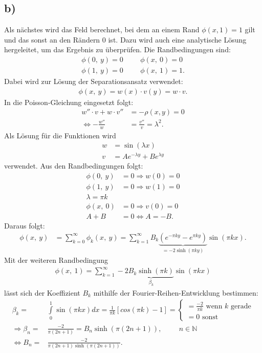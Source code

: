 \subsection*{b)}
Als nächstes wird das Feld berechnet, bei dem an einem Rand $\phi(x,1)=1$ gilt und das sonst an den Rändern 0 ist.
Dazu wird auch eine analytische Lösung hergeleitet, um das Ergebnis zu überprüfen.
Die Randbedingungen sind:
\begin{align}
	\phi(0,\ y)=0\hspace{1cm}\phi(x,\ 0)=0\\
	\phi(1,\ y)=0\hspace{1cm}\phi(x,\ 1)=1.
\end{align}
Dabei wird zur Lösung der Separationsansatz verwendet: 
\begin{align}
	\phi(x,\ y)=w(x)\cdot v(y)=w\cdot v.
\end{align}
In die Poisson-Gleichung eingesetzt folgt:
\begin{align}
	w'' \cdot v + w\cdot v'' &= -\rho(x,y)=0\\
	\Leftrightarrow-\frac{w''}{w}&=\frac{v''}{v}=\lambda^2.
\end{align}
Als Lösung für die Funktionen wird
\begin{align}
	w&=\sin(\lambda x)\label{eq:w}\\
	v&=Ae^{-\lambda y}+Be^{\lambda y}
\end{align}
verwendet.
Aus den Randbedingungen folgt:
\begin{align}
	\phi(0,\ y)&=0\Rightarrow w(0)=0\\
	\phi(1,\ y)&=0\Rightarrow w(1)=0\\
	\lambda = \pi k\\
	\phi(x,\ 0)&=0\Rightarrow v(0)=0\\
	A+B&=0\Leftrightarrow A=-B.
\end{align}
Daraus folgt:
\begin{align}
	\phi(x,\ y)&=\sum\limits_{k=0}^{\infty}\phi_k(x,\ y)=\sum\limits_{k=1}^{\infty}B_k\underbrace{\left( e^{-\pi ky }-e^{\pi k y} \right)}_{=-2\sinh(\pi k y)}\sin(\pi k x).
\end{align}
Mit der weiteren Randbedingung
\begin{align}
	\phi(x,\ 1)=\sum\limits_{k=1}^{\infty}-2\underbrace{ B_k\sinh(\pi k) }_{ \beta_k}\sin(\pi k x)
\end{align}
lässt sich der Koeffizient $B_k$ mithilfe der Fourier-Reihen-Entwicklung bestimmen:
\newpage
\begin{align}
	\beta_k=&\int\limits_{0}^{1}\sin(\pi k x)dx=\frac{1}{\pi k} [cos(\pi k) - 1]=
	\begin{cases}
		=\frac{-2}{\pi k}\text{ wenn }k\text{ gerade}\\
		=0 \text{ sonst}
	\end{cases}\\
	\Rightarrow
	\beta_n=&\frac{-2}{\pi (2n+1)}=B_n\sinh(\pi (2n+1)),\hspace{1cm}n\in\mathbb{N}\\
	\Leftrightarrow B_n=&\frac{-2}{\pi(2n+1)\sinh(\pi(2n+1))}.
\end{align}
